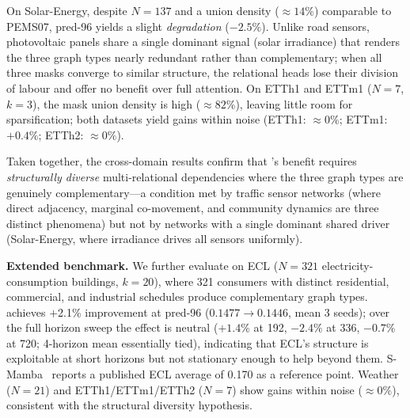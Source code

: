 On Solar-Energy, despite $N{=}137$ and a union density (${\approx}14\%$) comparable
to PEMS07, pred-96 yields a slight \emph{degradation} ($-2.5\%$).
Unlike road sensors, photovoltaic panels share a single dominant signal (solar
irradiance) that renders the three graph types nearly redundant rather than
complementary; when all three masks converge to similar structure, the relational
heads lose their division of labour and offer no benefit over full attention.
On ETTh1 and ETTm1 ($N{=}7$, $k{=}3$), the mask union density is high
(${\approx}82\%$), leaving little room for sparsification; both datasets yield
gains within noise (ETTh1: ${\approx}0\%$; ETTm1: $+0.4\%$; ETTh2: ${\approx}0\%$).

Taken together, the cross-domain results confirm that \mr{}'s benefit requires
\emph{structurally diverse} multi-relational dependencies where the three graph types
are genuinely complementary---a condition met by traffic sensor networks (where direct
adjacency, marginal co-movement, and community dynamics are three distinct phenomena)
but not by networks with a single dominant shared driver
(Solar-Energy, where irradiance drives all sensors uniformly).

\textbf{Extended benchmark.}
\label{sec:extended}
We further evaluate on ECL ($N{=}321$ electricity-consumption buildings, $k{=}20$),
where 321 consumers with distinct residential, commercial, and industrial schedules
produce complementary graph types.
\mr{} achieves $+$2.1\% improvement at pred-96 ($0.1477\to0.1446$, mean 3 seeds);
over the full horizon sweep the effect is neutral ($+1.4\%$ at 192, $-2.4\%$ at
336, $-0.7\%$ at 720; 4-horizon mean essentially tied), indicating that ECL's
structure is exploitable at short horizons but not stationary enough to help
beyond them. S-Mamba~\cite{wang2024smamba} reports a published ECL average of
0.170 as a reference point.
Weather ($N{=}21$) and ETTh1/ETTm1/ETTh2 ($N{=}7$) show gains within noise
(${\approx}0\%$), consistent with the structural diversity hypothesis.


